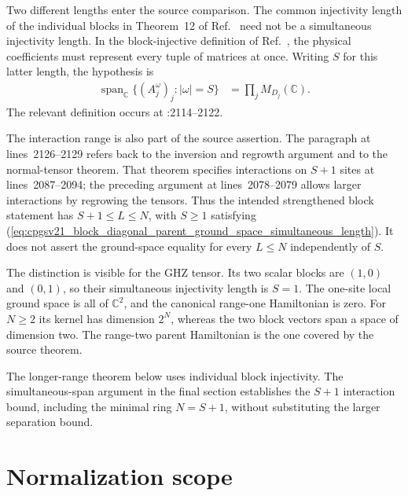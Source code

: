 \documentclass{article}
\begin{document}
Two different lengths enter the source comparison. The common injectivity
length of the individual blocks in Theorem~12 of
Ref.~\cite{PerezGarcia2007MPSReps} need not be a simultaneous injectivity
length. In the block-injective definition of Ref.~\cite{Cirac2021Matrix},
the physical coefficients must represent every tuple of matrices at once.
Writing $S$ for this latter length, the hypothesis is
\begin{align}
  \operatorname{span}_{\mathbb C}
  \{(A_j^\omega)_j:|\omega|=S\}
  &=\prod_j M_{D_j}(\mathbb C).
  \label{eq:cpgsv21_block_diagonal_parent_ground_space_simultaneous_length}
\end{align}
The relevant definition occurs at
:2114--2122.

The interaction range is also part of the source assertion. The paragraph
at lines~2126--2129 refers back to the inversion and regrowth argument and
to the normal-tensor theorem. That theorem specifies interactions on
$S+1$ sites at lines~2087--2094; the preceding argument at
lines~2078--2079 allows larger interactions by regrowing the tensors.
Thus the intended strengthened block statement has
$S+1\leq L\leq N$, with $S\geq1$ satisfying
(\ref{eq:cpgsv21_block_diagonal_parent_ground_space_simultaneous_length}). It does not assert the
ground-space equality for every $L\leq N$ independently of $S$.

The distinction is visible for the GHZ tensor. Its two scalar blocks are
$(1,0)$ and $(0,1)$, so their simultaneous injectivity length is $S=1$.
The one-site local ground space is all of $\mathbb C^2$, and the canonical
range-one Hamiltonian is zero. For $N\geq2$ its kernel has dimension $2^N$,
whereas the two block vectors span a space of dimension two. The
range-two parent Hamiltonian is the one covered by the source theorem.

The longer-range theorem below uses individual block injectivity.
The simultaneous-span argument in the final section establishes the
$S+1$ interaction bound, including the minimal ring $N=S+1$, without
substituting the larger separation bound.

\section{Normalization scope}
\end{document}
